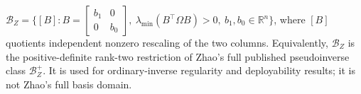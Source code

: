 \(\mathcal B_Z=\{[B]:B=\begin{bmatrix}b_1&0\\0&b_0\end{bmatrix},\ \lambda_{\min}(B^{\top}\Omega B)>0,\ b_1,b_0\in\mathbb R^n\}\), where \([B]\) quotients independent nonzero rescaling of the two columns.  Equivalently, \(\mathcal B_Z\) is the positive-definite rank-two restriction of Zhao's full published pseudoinverse class \(\mathcal B_Z^+\).  It is used for ordinary-inverse regularity and deployability results; it is not Zhao's full basis domain.